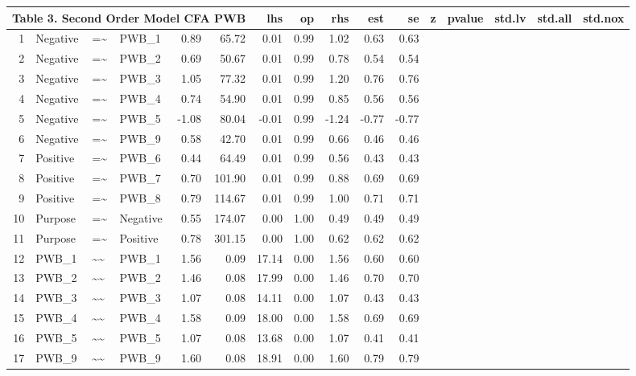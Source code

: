 \documentclass{article}
\begin{document}
\begin{table}[ht]
\centering
\begin{tabular}{rlllrrrrrrr}
 \multicolumn{ 6 }{l}{ Table 3. Second Order Model CFA PWB} \cr 
  \hline
 & lhs & op & rhs & est & se & z & pvalue & std.lv & std.all & std.nox \\ 
  \hline
1 & Negative & =\~{} & PWB\_1 & 0.89 & 65.72 & 0.01 & 0.99 & 1.02 & 0.63 & 0.63 \\ 
  2 & Negative & =\~{} & PWB\_2 & 0.69 & 50.67 & 0.01 & 0.99 & 0.78 & 0.54 & 0.54 \\ 
  3 & Negative & =\~{} & PWB\_3 & 1.05 & 77.32 & 0.01 & 0.99 & 1.20 & 0.76 & 0.76 \\ 
  4 & Negative & =\~{} & PWB\_4 & 0.74 & 54.90 & 0.01 & 0.99 & 0.85 & 0.56 & 0.56 \\ 
  5 & Negative & =\~{} & PWB\_5 & -1.08 & 80.04 & -0.01 & 0.99 & -1.24 & -0.77 & -0.77 \\ 
  6 & Negative & =\~{} & PWB\_9 & 0.58 & 42.70 & 0.01 & 0.99 & 0.66 & 0.46 & 0.46 \\ 
  7 & Positive & =\~{} & PWB\_6 & 0.44 & 64.49 & 0.01 & 0.99 & 0.56 & 0.43 & 0.43 \\ 
  8 & Positive & =\~{} & PWB\_7 & 0.70 & 101.90 & 0.01 & 0.99 & 0.88 & 0.69 & 0.69 \\ 
  9 & Positive & =\~{} & PWB\_8 & 0.79 & 114.67 & 0.01 & 0.99 & 1.00 & 0.71 & 0.71 \\ 
  10 & Purpose & =\~{} & Negative & 0.55 & 174.07 & 0.00 & 1.00 & 0.49 & 0.49 & 0.49 \\ 
  11 & Purpose & =\~{} & Positive & 0.78 & 301.15 & 0.00 & 1.00 & 0.62 & 0.62 & 0.62 \\ 
  12 & PWB\_1 & \~{}\~{} & PWB\_1 & 1.56 & 0.09 & 17.14 & 0.00 & 1.56 & 0.60 & 0.60 \\ 
  13 & PWB\_2 & \~{}\~{} & PWB\_2 & 1.46 & 0.08 & 17.99 & 0.00 & 1.46 & 0.70 & 0.70 \\ 
  14 & PWB\_3 & \~{}\~{} & PWB\_3 & 1.07 & 0.08 & 14.11 & 0.00 & 1.07 & 0.43 & 0.43 \\ 
  15 & PWB\_4 & \~{}\~{} & PWB\_4 & 1.58 & 0.09 & 18.00 & 0.00 & 1.58 & 0.69 & 0.69 \\ 
  16 & PWB\_5 & \~{}\~{} & PWB\_5 & 1.07 & 0.08 & 13.68 & 0.00 & 1.07 & 0.41 & 0.41 \\ 
  17 & PWB\_9 & \~{}\~{} & PWB\_9 & 1.60 & 0.08 & 18.91 & 0.00 & 1.60 & 0.79 & 0.79 \\ 

\end{tabular}
\end{table}
\end{document}
